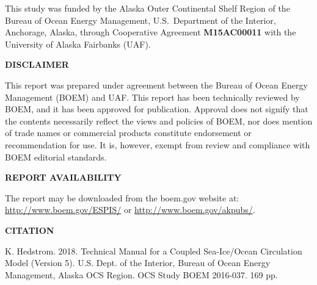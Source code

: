 This study was funded by the Alaska Outer Continental Shelf Region
of the Bureau of Ocean Energy Management, U.S.\ Department of the
Interior, Anchorage, Alaska, through Cooperative Agreement
{\bf M15AC00011} with the University of Alaska Fairbanks (UAF).


\newpage
\vfil
\centerline{\bf DISCLAIMER}

\vfil
\noindent
This report was prepared under agreement between the Bureau of Ocean
Energy Management (BOEM) and UAF. This report has
been technically reviewed by BOEM, and it has been approved for
publication. Approval does not signify that the contents necessarily
reflect the views and policies of BOEM, nor does mention of trade
names or commercial products constitute endorsement or
recommendation for use. It is, however, exempt from review and
compliance with BOEM editorial standards.

\vfil
\centerline{\bf REPORT AVAILABILITY}
\vfil

\noindent
The report may be downloaded
from the boem.gov website at:
\href{http://www.boem.gov/ESPIS/}{http://www.boem.gov/ESPIS/} or
\href{http://www.boem.gov/akpubs/}{http://www.boem.gov/akpubs/}.

\vfil

\centerline{\bf CITATION}
\vfil

\noindent K. Hedstrom. 2018. Technical Manual for a Coupled Sea-Ice/Ocean
Circulation Model (Version 5).
U.S. Dept. of the Interior, Bureau of Ocean Energy Management,
Alaska OCS Region. OCS Study BOEM 2016-037. 169 pp.


\pagestyle{fancyplain}
\renewcommand{\headrulewidth}{0pt}
\setcounter{page}{1}
\tableofcontents
\newpage
\listoffigures
\listoftables
%





%

%


%
%
\appendix






%



%

\newpage
\pagestyle{empty}


